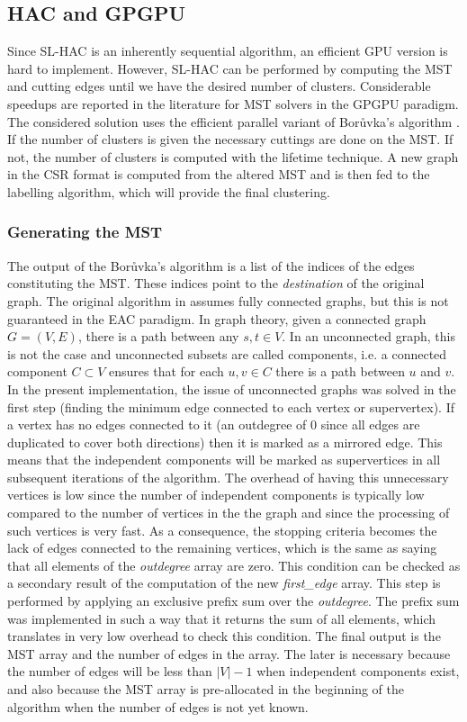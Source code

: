 \subsection{HAC and GPGPU}
Since SL-HAC is an inherently sequential algorithm, an efficient GPU version is hard to implement.
However, SL-HAC can be performed by computing the MST and cutting edges until we have the desired number of clusters.
Considerable speedups are reported in the literature for MST solvers in the GPGPU paradigm.
The considered solution uses the efficient parallel variant of Borůvka's algorithm \cite{Sousa2015}. 
If the number of clusters is given the necessary cuttings are done on the MST. 
If not, the number of clusters is computed with the lifetime technique. 
A new graph in the CSR format is computed from the altered MST and is then fed to the labelling algorithm, which will provide the final clustering.

\subsubsection{Generating the MST}
The output of the Borůvka's algorithm is a list of the indices of the edges constituting the MST. 
These indices point to the \emph{destination} of the original graph. 
The original algorithm in \cite{Sousa2015} assumes fully connected graphs, but this is not guaranteed in the EAC paradigm.
In graph theory, given a connected graph $G = (V,E)$, there is a path between any $s,t \in V$.
In an unconnected graph, this is not the case and unconnected subsets are called components, i.e. a connected component $C \subset V$ ensures that for each $u,v \in C$ there is a path between $u$ and $v$.
In the present implementation, the issue of unconnected graphs was solved in the first step (finding the minimum edge connected to each vertex or supervertex). 
If a vertex has no edges connected to it (an outdegree of 0 since all edges are duplicated to cover both directions) then it is marked as a mirrored edge. 
This means that the independent components will be marked as supervertices in all subsequent iterations of the algorithm. 
The overhead of having this unnecessary vertices is low since the number of independent components is typically low compared to the number of vertices in the the graph and since the processing of such vertices is very fast.
As a consequence, the stopping criteria becomes the lack of edges connected to the remaining vertices, which is the same as saying that all elements of the \emph{outdegree} array are zero. 
This condition can be checked as a secondary result of the computation of the new \emph{first\_edge} array. 
This step is performed by applying an exclusive prefix sum over the \emph{outdegree}. 
The prefix sum was implemented in such a way that it returns the sum of all elements, which translates in very low overhead to check this condition.
The final output is the MST array and the number of edges in the array. 
The later is necessary because the number of edges will be less than $|V|-1$ when independent components exist, and also because the MST array is pre-allocated in the beginning of the algorithm when the number of edges is not yet known.

